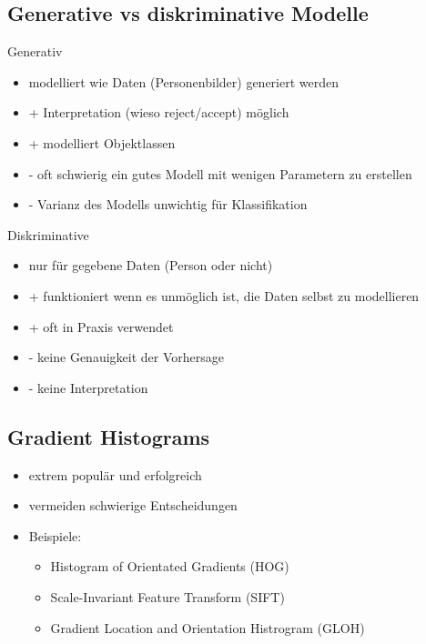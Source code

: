 \documentclass[paper=a4, fontsize=11pt]{scrartcl} %
\numberwithin{equation}{section} %
\numberwithin{figure}{section} %
\numberwithin{table}{section} %
\begin{document}
\subsection{Generative vs diskriminative Modelle}

\begin{minipage}{0.45\textwidth}
Generativ
\begin{itemize}
\item modelliert wie Daten (Personenbilder) generiert werden
\item + Interpretation (wieso reject/accept) möglich
\item + modelliert Objektlassen
\item - oft schwierig ein gutes Modell mit wenigen Parametern zu erstellen
\item - Varianz des Modells unwichtig für Klassifikation
\end{itemize}
\end{minipage} \hfill
\begin{minipage}{0.45\textwidth}
Diskriminative
\begin{itemize}
\item nur für gegebene Daten (Person oder nicht)
\item + funktioniert wenn es unmöglich ist, die Daten selbst zu modellieren
\item + oft in Praxis verwendet
\item - keine Genauigkeit der Vorhersage
\item - keine Interpretation
\end{itemize}
\end{minipage}

\subsection{Gradient Histograms}

\begin{itemize}
\item extrem populär und erfolgreich
\item vermeiden schwierige Entscheidungen
\item Beispiele:
\begin{itemize}
\item Histogram of Orientated Gradients (HOG)
\item Scale-Invariant Feature Transform (SIFT)
\item Gradient Location and Orientation Histrogram (GLOH)
\end{itemize}
\end{itemize}
\end{document}

